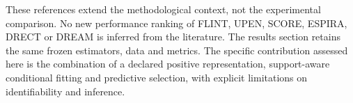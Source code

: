 These references extend the methodological context, not the experimental comparison. No new performance ranking of FLINT, UPEN, SCORE, ESPIRA, DRECT or DREAM is inferred from the literature. The results section retains the same frozen estimators, data and metrics. The specific contribution assessed here is the combination of a declared positive representation, support-aware conditional fitting and predictive selection, with explicit limitations on identifiability and inference.

